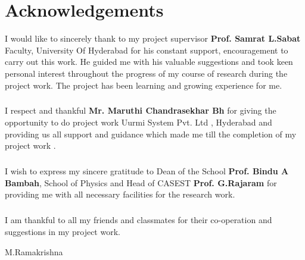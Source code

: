 
\chapter*{\centering Acknowledgements}
I would like to sincerely thank to my project supervisor \textbf{Prof. Samrat L.Sabat} Faculty,
University Of Hyderabad for his constant support, encouragement to carry out this work.
He guided me with his valuable suggestions and took keen personal interest throughout the
progress of my course of research during the project work. The project has been learning
and growing experience for me.
\paragraph*{}I respect and thankful \textbf{Mr. Maruthi Chandrasekhar Bh} for giving the opportunity to do project
work Uurmi System Pvt. Ltd , Hyderabad and providing us all support and guidance which
made me till the completion of my project work .
\paragraph*{}I wish to express my sincere gratitude to Dean of the School \textbf{Prof. Bindu A Bambah}, School of Physics and Head of CASEST \textbf{Prof. G.Rajaram} for providing me with all necessary facilities for the
research work.
\paragraph*{}I am thankful to all my friends and classmates for their co-operation and suggestions in
my project work.
\vfill
\begin{flushright}
M.Ramakrishna
\end{flushright} 